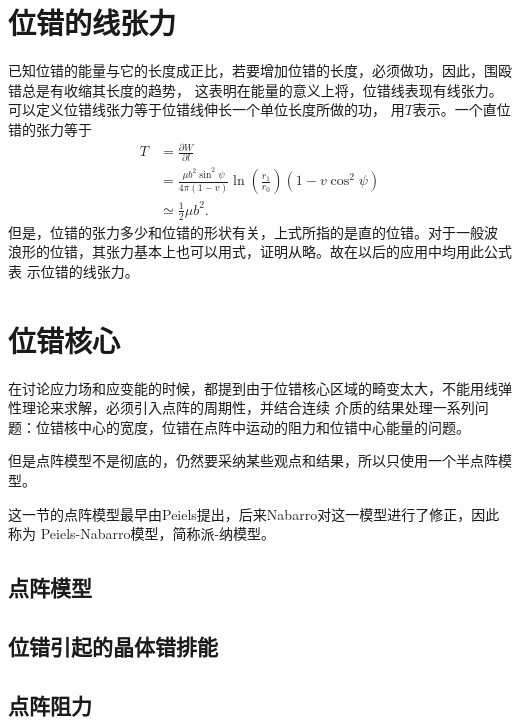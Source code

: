         \section{位错的线张力}
            已知位错的能量与它的长度成正比，若要增加位错的长度，必须做功，因此，围殴错总是有收缩其长度的趋势，
            这表明在能量的意义上将，位错线表现有线张力。可以定义位错线张力等于位错线伸长一个单位长度所做的功，
            用$T$表示。一个直位错的张力等于
            \begin{equation}
                \begin{aligned}
                    T&=\frac{\partial W}{\partial l}\\
                    &=\frac{\mu b^{2} \sin ^{2} \psi}{4 \pi(1-v)} \ln \left(\frac{r_{1}}{r_{0}}\right)\left(1-v \cos ^{2} \psi\right)\\
                    &\simeq \frac{1}{2}\mu b^2.
                \end{aligned}
            \end{equation}
            但是，位错的张力多少和位错的形状有关，上式所指的是直的位错。对于一般波
            浪形的位错，其张力基本上也可以用式，证明从略。故在以后的应用中均用此公式表
            示位错的线张力。
        \section{位错核心}
            在讨论应力场和应变能的时候，都提到由于位错核心区域的畸变太大，不能用线弹性理论来求解，必须引入点阵的周期性，并结合连续
            介质的结果处理一系列问题：位错核中心的宽度，位错在点阵中运动的阻力和位错中心能量的问题。

            但是点阵模型不是彻底的，仍然要采纳某些观点和结果，所以只使用一个半点阵模型。

            这一节的点阵模型最早由Peiels提出，后来Nabarro对这一模型进行了修正，因此称为
            Peiels-Nabarro模型，简称派-纳模型。
            \subsection{点阵模型}
                
            \subsection{位错引起的晶体错排能}
            \subsection{点阵阻力}

